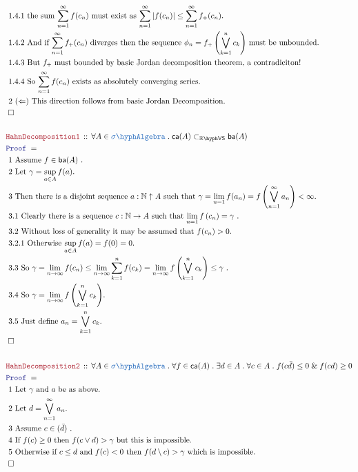 \documentclass[12pt]{scrartcl}
\newcommand{\TYPE}[1]{\textcolor{NavyBlue}{\mathtt{#1}}}
\newcommand{\LOGIC}[1]{\textcolor{Blue}{\mathtt{#1}}}
\newcommand{\THM}[1]{\textcolor{Maroon}{\mathtt{#1}}}
\renewcommand{\.}{\; . \;}
\newcommand{\Theorem}[2]{& \THM{#1} \, :: \, #2 \\ & \Proof = \\ }
\newcommand{\Page}[1]{ \begin{align*} #1 \end{align*}   }
\renewcommand{\And}{\; \& \;}
\newcommand{\Reals}{\mathbb{R} }
\newcommand{\Nat}{\mathbb{N} }
\newcommand{\QED}{\; \square}
\newcommand{\EndProof}{& \QED \\}
\newcommand{\Proof}{\LOGIC{Proof} \; }
\newcommand{\Explain}[1]{& \text{#1.} \\}
\newcommand{\Exclaim}[1]{& \text{#1!} \\}
\newcommand{\SA}{\TYPE{\sigma \hyph Algebra}}
\newcommand{\subvec}[1]{\subset_{\VS{#1}}}%
\newcommand{\VS}[1]{#1\hyph\mathsf{VS}} %
\newcommand{\caf}{\mathsf{ca}}
\newcommand{\baf}{\mathsf{ba}}
\begin{document}
\Page{
	 \Explain{ 1.4.1 the sum $\sum^\infty_{n=1} f(c_n)$ must exist
	 	as $\sum^\infty_{n=1} |f(c_n)| \le \sum^\infty_{n=1} f_+(c_n) $}
	 \Explain{ 1.4.2 And if $\sum^\infty_{n=1} f_+(c_n) $ diverges then the 
	 	sequence $\phi_n = f_+\left( \bigvee^n_{k= 1} c_k\right)$ must be unbounded}
	 \Exclaim{ 1.4.3 But $f_+$ must bounded by basic Jordan decomposition theorem, a contradiciton}
	 \Explain{ 1.4.4 So $\sum^\infty_{n=1} f(c_n)$ exists as absolutely converging series}
	 \Explain{ 2 $(\Leftarrow)$ This direction follows from basic Jordan Decomposition}
	 \EndProof
	\\	 
	 \Theorem{HahnDecomposition1}
	{
		\forall A \in \SA \.  
		\caf(A) \subvec{\Reals} \baf(A) 
	}
	\Explain{ 1 Assume $f \in \baf(A)$ }
	\Explain{ 2  Let  $\gamma = \sup_{a \in A} f(a)$}
	\Explain{ 3 Then there is a disjoint sequence $a : \Nat \uparrow A$
		such that $\gamma = \lim_{n=1} f(a_n) = f\left( \bigvee^\infty_{n=1}  a_n \right) < \infty$}
	\Explain{ 3.1 Clearly there is a sequence $c : \Nat \to A$ 
		such that $\lim_{n=1} f\left( c_n \right) = \gamma$
	}
	\Explain{ 3.2 Without loss of generality it may be assumed that $f(c_n) > 0$}
	\Explain{ 3.2.1 Otherwise $\sup_{a \in A} f(a) = f(0) = 0$}
	\Explain{ 3.3 So $\gamma = 
		\lim_{n \to \infty} f(c_n) \le 
		\lim_{n \to \infty} \sum^n_{k=1} f(c_k)  =
		\lim_{n \to \infty} f\left( \bigvee^n_{k=1} c_k \right) \le \gamma$  }
	\Explain{ 3.4 So $\gamma = \lim_{n \to \infty} f\left( \bigvee^n_{k=1} c_k \right)$}	
	\Explain{ 3.5 Just define $a_n = \bigvee^n_{k=1} c_k$}
	\EndProof	
	\\
	\Theorem{HahnDecomposition2}
	{
		\forall A \in \SA \.  
		\forall f \in \caf(A) \.
		\exists d \in A \.
		\forall c \in A \.
		f(c\bar d) \le 0 \And f(cd) \ge 0
	}
	\Explain{ 1 Let $\gamma$ and $a$ be as above}
	\Explain{ 2 Let $d = \bigvee^\infty_{n=1} a_n$}
	\Explain{ 3 Assume $c \in (\bar d)$ }
	\Explain{ 4 If $f(c) \ge 0$ then $f(c \vee d) > \gamma$ but this is impossible}
	\Explain{ 5 Otherwise if $c \le d$ and $f(c) < 0$ then $f(d \setminus c) > \gamma$
		which is impossible}
	\EndProof
}
\newpage
\end{document}
